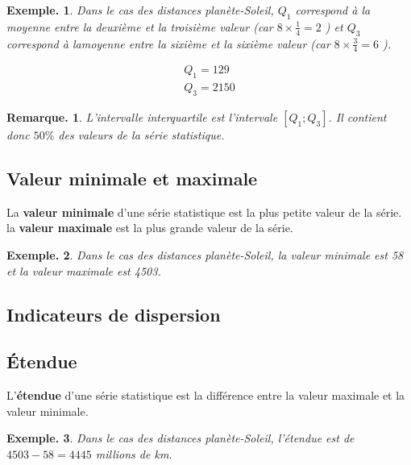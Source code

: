 \documentclass[12pt]{article}
\theoremstyle{break}
\newtheorem*{example}{Exemple.}
\newtheorem*{remark}{Remarque.}
\begin{document}
\begin{example}
  Dans le cas des distances planète-Soleil, $Q_{1}$ correspond à la moyenne entre la deuxième et la troisième valeur (car $8 \times \frac{1}{4}=2$ ) et $Q_{3}$ correspond à lamoyenne entre la sixième et la sixième valeur (car $8 \times \frac{3}{4}=6$ ).

  $$
  \begin{gathered}
    Q_{1}=129 \\
    Q_{3}=2150
  \end{gathered}
  $$
\end{example}

\begin{remark}
  L'intervalle interquartile est l'intervale $\left[Q_{1} ; Q_{3}\right]$. Il contient donc $50 \%$ des valeurs de la série statistique.
\end{remark}

\subsection{Valeur minimale et maximale}
\begin{definition}{}{}
  La \textbf{valeur minimale} d'une série statistique est la plus petite valeur de la série. la \textbf{valeur maximale} est la plus grande valeur de la série.
\end{definition}

\begin{example}
  Dans le cas des distances planète-Soleil, la valeur minimale est 58 et la valeur maximale est 4503.
\end{example}

\subsection{Indicateurs de dispersion}
\subsection{Étendue}
\begin{definition}{}{}
  L'\textbf{étendue} d'une série statistique est la différence entre la valeur maximale et la valeur minimale.
\end{definition}

\begin{example}
  Dans le cas des distances planète-Soleil, l'étendue est de $4503-58=4445$ millions de km.
\end{example}
\end{document}
